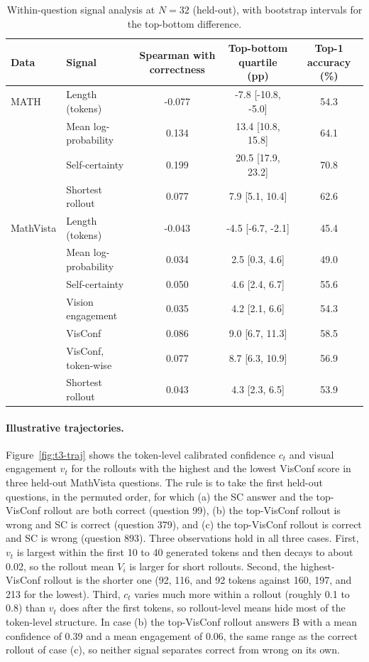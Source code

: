 \documentclass{article}
\begin{document}
\begin{table}[H]
\centering
\caption{Within-question signal analysis at $N=32$ (held-out), with bootstrap intervals for the top-bottom difference.}
\label{tab:app-signals}
\footnotesize
\begin{tabular}{llccc}
\toprule
Data & Signal & Spearman with correctness & Top-bottom quartile (pp) & Top-1 accuracy (\%) \\
\midrule
MATH & Length (tokens) & -0.077 & -7.8 [-10.8, -5.0] & 54.3 \\
 & Mean log-probability & 0.134 & 13.4 [10.8, 15.8] & 64.1 \\
 & Self-certainty & 0.199 & 20.5 [17.9, 23.2] & 70.8 \\
 & Shortest rollout & 0.077 & 7.9 [5.1, 10.4] & 62.6 \\
MathVista & Length (tokens) & -0.043 & -4.5 [-6.7, -2.1] & 45.4 \\
 & Mean log-probability & 0.034 & 2.5 [0.3, 4.6] & 49.0 \\
 & Self-certainty & 0.050 & 4.6 [2.4, 6.7] & 55.6 \\
 & Vision engagement & 0.035 & 4.2 [2.1, 6.6] & 54.3 \\
 & VisConf & 0.086 & 9.0 [6.7, 11.3] & 58.5 \\
 & VisConf, token-wise & 0.077 & 8.7 [6.3, 10.9] & 56.9 \\
 & Shortest rollout & 0.043 & 4.3 [2.3, 6.5] & 53.9 \\
\bottomrule
\end{tabular}
\end{table}


\paragraph{Illustrative trajectories.} Figure~\ref{fig:t3-traj} shows the token-level calibrated confidence $c_t$ and visual engagement $v_t$ for the rollouts with the highest and the lowest VisConf score in three held-out MathVista questions. The rule is to take the first held-out questions, in the permuted order, for which (a) the SC answer and the top-VisConf rollout are both correct (question 99), (b) the top-VisConf rollout is wrong and SC is correct (question 379), and (c) the top-VisConf rollout is correct and SC is wrong (question 893). Three observations hold in all three cases. First, $v_t$ is largest within the first 10 to 40 generated tokens and then decays to about 0.02, so the rollout mean $V_i$ is larger for short rollouts. Second, the highest-VisConf rollout is the shorter one (92, 116, and 92 tokens against 160, 197, and 213 for the lowest). Third, $c_t$ varies much more within a rollout (roughly 0.1 to 0.8) than $v_t$ does after the first tokens, so rollout-level means hide most of the token-level structure. In case (b) the top-VisConf rollout answers B with a mean confidence of 0.39 and a mean engagement of 0.06, the same range as the correct rollout of case (c), so neither signal separates correct from wrong on its own.
\end{document}

